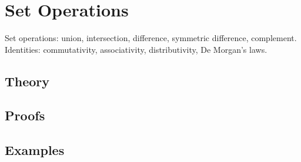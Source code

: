 
\section{Set Operations}
\label{sec:2.2.01-set-operations}

\begin{ticket}
Set operations: union, intersection, difference, symmetric difference, complement. Identities: commutativity, associativity, distributivity, De Morgan's laws.
\end{ticket}

\subsection*{Theory}

\subsection*{Proofs}

\subsection*{Examples}
